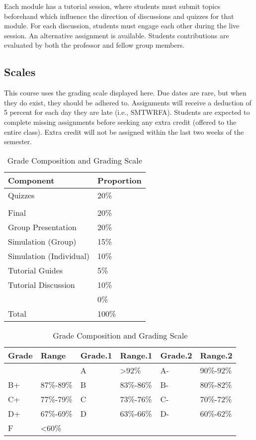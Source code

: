 \documentclass[10pt,]{article}
\begin{document}
Each module has a tutorial session, where students must submit topics
beforehand which influence the direction of discussions and quizzes for
that module. For each discussion, students must engage each other during
the live session. An alternative assignment is available. Students
contributions are evaluated by both the professor and fellow group
members.

\hypertarget{scales}{%
\subsection{Scales}\label{scales}}

This course uses the grading scale displayed here. Due dates are rare,
but when they do exist, they should be adhered to. Assignments will
receive a deduction of 5 percent for each day they are late (i.e.,
SMTWRFA). Students are expected to complete missing assignments before
seeking any extra credit (offered to the entire class). Extra credit
will not be assigned within the last two weeks of the semester.

\begin{table}[!h]
\caption{\label{tab:unnamed-chunk-3}Grade Composition and Grading Scale}

\centering
\begin{tabular}[t]{ll}
\toprule
Component & Proportion\\
\midrule
Quizzes & 20\%\\
 & \\
Final & 20\%\\
Group Presentation & 20\%\\
Simulation (Group) & 15\%\\
\addlinespace
Simulation (Individual) & 10\%\\
Tutorial Guides & 5\%\\
Tutorial Discussion & 10\%\\
 & 0\%\\
Total & 100\%\\
\bottomrule
\end{tabular}
\centering
\begin{tabular}[t]{llllll}
\toprule
Grade & Range & Grade.1 & Range.1 & Grade.2 & Range.2\\
\midrule
 &  & A & >92\% & A- & 90\%-92\%\\
B+ & 87\%-89\% & B & 83\%-86\% & B- & 80\%-82\%\\
C+ & 77\%-79\% & C & 73\%-76\% & C- & 70\%-72\%\\
D+ & 67\%-69\% & D & 63\%-66\% & D- & 60\%-62\%\\
F & <60\% &  &  &  & \\
\bottomrule
\end{tabular}
\end{table}
\end{document}

